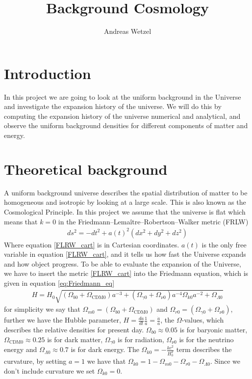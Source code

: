 \documentclass{article}
\begin{document}
\title{{Background Cosmology}}
\author{{Andreas Wetzel}}

\maketitle
\begin{multicols}{2}
\section{Introduction}
In this project we are going to look at the uniform background in the Universe and investigate the expansion history of the universe. We will do this by computing the expansion history of the universe numerical and analytical, and observe the uniform background densities for different components of matter and energy.  
\section{Theoretical background}
A uniform background universe describes the spatial distribution of matter to be homogeneous and isotropic by looking at a large scale. This is also known as the Cosmological Principle. In this project we assume that the universe is flat which means that $k=0$ in the Friedmann–Lemaître–Robertson–Walker metric (FRLW)
\begin{align}
    ds^2 =-dt^2+a(t)^2(dx^2+dy^2+dz^2)\label{FLRW_cart}
\end{align}
Where equation \eqref{FLRW_cart} is in Cartesian coordinates. $a(t)$ is the only free variable in equation \eqref{FLRW_cart}, and it tells us how fast the Universe expands and how object progress. To be able to evaluate the expansion of the Universe, we have to insert the metric \eqref{FLRW_cart} into the Friedmann equation, which is given in equation \eqref{eq:Friedmann_eq}
\begin{align}
    H=H_0\sqrt{(\Omega_{b0}+\Omega_{\text{CDM}0})a^{-3}+(\Omega_{\gamma0}+\Omega_{\nu0})a^{-4}\Omega_{k0}a^{-2}+\Omega_{\Lambda0}} \label{eq:Friedmann_eq}
\end{align}
for simplicity we say that $\Omega_{m0}=(\Omega_{b0}+\Omega_{\text{CDM}0})$ and $\Omega_{r0}=(\Omega_{\gamma0}+\Omega_{\nu0})$, further we
have the Hubble parameter, $H=\frac{da}{dt}\frac{1}{a}=\frac{\Dot{a}}{a}$, the $\Omega$-values, which describes the relative densities for present day. $\Omega_{b0}\approx 0.05$ is for baryonic matter, $\Omega_{\text{CDM}0}\approx 0.25$ is for dark matter, $\Omega_{\gamma0}$ is for radiation, $\Omega_{\nu0}$ is for the neutrino energy and $\Omega_{\Lambda 0}\approx 0.7$ is for dark energy. The $\Omega_{k0}=-\frac{kc^2}{H_0^2}$ term describes the curvature, by setting $a=1$ we have that $\Omega_{k0}=1-\Omega_{m0}-\Omega_{r0}-\Omega_{\Lambda0}$. Since we don't include curvature we set $\Omega_{k0}=0$. 

\end{multicols}
\end{document}
